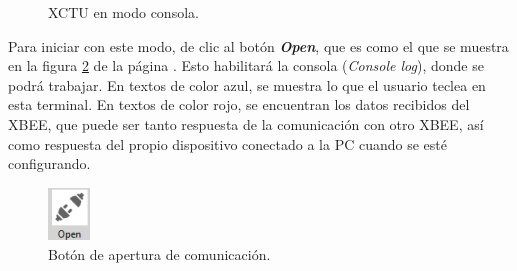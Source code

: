 \begin{figure}[H] %
\caption{XCTU en modo consola.}
\label{fig:XTerm}
\end{figure}

Para iniciar con este modo, de clic al botón \textit{\textbf{Open}}, que es como el que se muestra en la figura \ref{fig:OpenC} de la página \pageref{fig:OpenC}. Esto habilitará la consola (\textit{Console log}), donde se podrá trabajar. En textos de color azul, se muestra lo que el usuario teclea en esta terminal. En textos de color rojo, se encuentran los datos recibidos del XBEE, que puede ser tanto respuesta de la comunicación con otro XBEE, así como respuesta del propio dispositivo conectado a la PC cuando se esté configurando.

\begin{figure} %
    \centering
    \includegraphics[width=0.10\textwidth]{Figures/XCTU/OpenButton}
    \caption{Botón de apertura de comunicación.}
    \label{fig:OpenC}
\end{figure}

